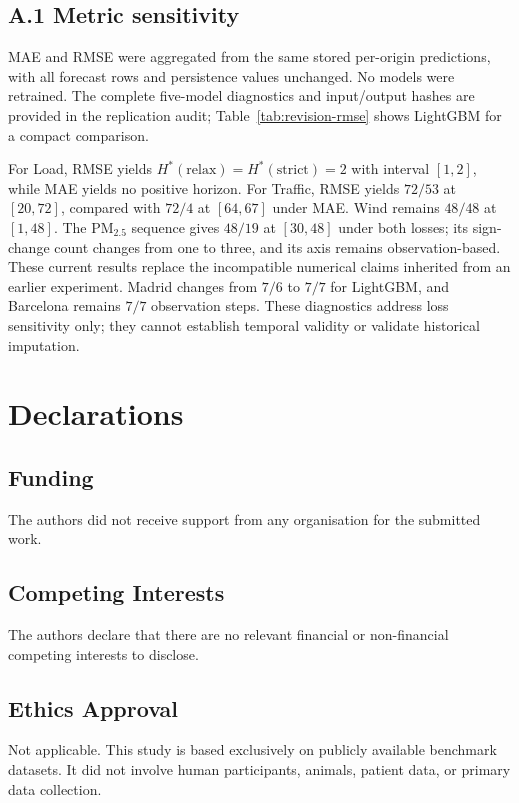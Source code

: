 \documentclass[pdflatex,sn-mathphys]{sn-jnl}
\begin{document}
\appendix
\subsection*{A.1 Metric sensitivity}\label{sec:metric-sensitivity}
MAE and RMSE were aggregated from the same stored per-origin predictions,
with all forecast rows and persistence values unchanged. No models were
retrained. The complete five-model diagnostics and input/output hashes are
provided in the replication audit; Table~\ref{tab:revision-rmse} shows
LightGBM for a compact comparison.

For Load, RMSE yields $H^*(\mathrm{relax})=H^*(\mathrm{strict})=2$ with
interval $[1,2]$, while MAE yields no positive horizon. For Traffic, RMSE
yields $72/53$ at $[20,72]$, compared with $72/4$ at $[64,67]$ under MAE.
Wind remains $48/48$ at $[1,48]$. The PM$_{2.5}$ sequence gives $48/19$
at $[30,48]$ under both losses; its sign-change count changes from one to
three, and its axis remains observation-based. These current results replace
the incompatible numerical claims inherited from an earlier experiment.
Madrid changes from $7/6$ to $7/7$ for LightGBM, and Barcelona remains
$7/7$ observation steps. These diagnostics address loss sensitivity only;
they cannot establish temporal validity or validate historical imputation.


\section*{Declarations}
\subsection*{Funding}
The authors did not receive support from any organisation for the submitted work.
\subsection*{Competing Interests}
The authors declare that there are no relevant financial or non-financial competing interests to disclose.
\subsection*{Ethics Approval}
Not applicable. This study is based exclusively on publicly available benchmark datasets. It did not involve human participants, animals, patient data, or primary data collection.
\end{document}

